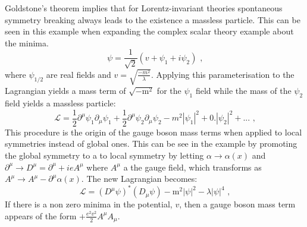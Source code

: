 Goldstone's theorem \cite{Goldstone:1962es} implies that for Lorentz-invariant theories spontaneous symmetry breaking always leads to the existence a massless particle.  This can be seen in this example when expanding the complex scalar theory example about the minima.
%
\begin{equation}
\psi = \frac{1}{\sqrt{2}}(v + \psi_{1} + i \psi_{2}) \text{ ,}
\end{equation}
%
\noindent where $\psi_{1/2}$ are real fields and $v = \sqrt{\frac{-m^{2}}{\lambda}}$.  Applying this parameterisation to the Lagrangian yields a mass term of $\sqrt{-\text{m}^{2}}$ for the $\psi_{1}$ field while the mass of the $\psi_{2}$ field yields a massless particle:
%
\begin{equation}
\mathcal{L} = \frac{1}{2}\partial^{\mu} \psi_{1} \partial_{\mu} \psi_{1} + \frac{1}{2}\partial^{\mu} \psi_{2} \partial_{\mu} \psi_{2} - m^{2}|\psi_{1}|^{2} + 0.|\psi_{2}|^{2} + ... \text{ ,}
\end{equation}
%
\noindent This procedure is the origin of the gauge boson mass terms when applied to local symmetries instead of global ones.  This can be see in the example by promoting the global symmetry to a to local symmetry by letting $\alpha \rightarrow \alpha(x)$ and $\partial^{\mu} \rightarrow D^{\mu} = \partial^{\mu} + ieA^{\mu}$ where $A^{\mu}$ a the gauge field, which transforms as $A^{\mu} \rightarrow A^{\mu} - \partial^{\mu}\alpha(x)$.  The new Lagrangian becomes:
%
\begin{equation}
\mathcal{L} = (D^{\mu} \psi)^{*} (D_{\mu} \psi) - \text{m}^{2} |\psi|^{2} - \lambda |\psi|^{4} \text{ ,}
\end{equation}
%
\noindent If there is a non zero minima in the potential, $v$, then a gauge boson mass term appears of the form $+\frac{e^{2}v^{2}}{2} A^{\mu} A_{\mu}$.



